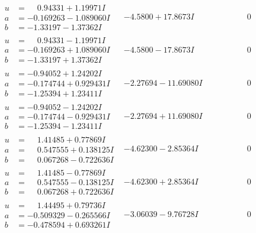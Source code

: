 \documentclass[1p]{elsarticle_modified}
\theoremstyle{definition}
\begin{document}
$$\begin{array}{c|c|c}
\begin{aligned}
u &= \phantom{-}0.94331 + 1.19971 I \\
a &= -0.169263 - 1.089060 I \\
b &= -1.33197 - 1.37362 I\end{aligned}
 & -4.5800 + 17.8673 I & \phantom{-0.000000 } 0 \\ \hline\begin{aligned}
u &= \phantom{-}0.94331 - 1.19971 I \\
a &= -0.169263 + 1.089060 I \\
b &= -1.33197 + 1.37362 I\end{aligned}
 & -4.5800 - 17.8673 I & \phantom{-0.000000 } 0 \\ \hline\begin{aligned}
u &= -0.94052 + 1.24202 I \\
a &= -0.174744 + 0.929431 I \\
b &= -1.25394 + 1.23411 I\end{aligned}
 & -2.27694 - 11.69080 I & \phantom{-0.000000 } 0 \\ \hline\begin{aligned}
u &= -0.94052 - 1.24202 I \\
a &= -0.174744 - 0.929431 I \\
b &= -1.25394 - 1.23411 I\end{aligned}
 & -2.27694 + 11.69080 I & \phantom{-0.000000 } 0 \\ \hline\begin{aligned}
u &= \phantom{-}1.41485 + 0.77869 I \\
a &= \phantom{-}0.547555 + 0.138125 I \\
b &= \phantom{-}0.067268 - 0.722636 I\end{aligned}
 & -4.62300 - 2.85364 I & \phantom{-0.000000 } 0 \\ \hline\begin{aligned}
u &= \phantom{-}1.41485 - 0.77869 I \\
a &= \phantom{-}0.547555 - 0.138125 I \\
b &= \phantom{-}0.067268 + 0.722636 I\end{aligned}
 & -4.62300 + 2.85364 I & \phantom{-0.000000 } 0 \\ \hline\begin{aligned}
u &= \phantom{-}1.44495 + 0.79736 I \\
a &= -0.509329 - 0.265566 I \\
b &= -0.478594 + 0.693261 I\end{aligned}
 & -3.06039 - 9.76728 I & \phantom{-0.000000 } 0\\

\end{array}$$
\end{document}
